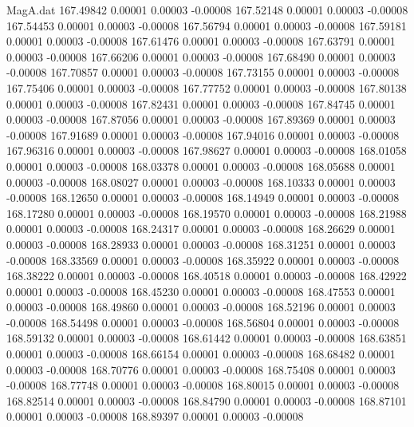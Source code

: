\begin{filecontents}{MagA.dat}
 167.49842    0.00001    0.00003   -0.00008
 167.52148    0.00001    0.00003   -0.00008
 167.54453    0.00001    0.00003   -0.00008
 167.56794    0.00001    0.00003   -0.00008
 167.59181    0.00001    0.00003   -0.00008
 167.61476    0.00001    0.00003   -0.00008
 167.63791    0.00001    0.00003   -0.00008
 167.66206    0.00001    0.00003   -0.00008
 167.68490    0.00001    0.00003   -0.00008
 167.70857    0.00001    0.00003   -0.00008
 167.73155    0.00001    0.00003   -0.00008
 167.75406    0.00001    0.00003   -0.00008
 167.77752    0.00001    0.00003   -0.00008
 167.80138    0.00001    0.00003   -0.00008
 167.82431    0.00001    0.00003   -0.00008
 167.84745    0.00001    0.00003   -0.00008
 167.87056    0.00001    0.00003   -0.00008
 167.89369    0.00001    0.00003   -0.00008
 167.91689    0.00001    0.00003   -0.00008
 167.94016    0.00001    0.00003   -0.00008
 167.96316    0.00001    0.00003   -0.00008
 167.98627    0.00001    0.00003   -0.00008
 168.01058    0.00001    0.00003   -0.00008
 168.03378    0.00001    0.00003   -0.00008
 168.05688    0.00001    0.00003   -0.00008
 168.08027    0.00001    0.00003   -0.00008
 168.10333    0.00001    0.00003   -0.00008
 168.12650    0.00001    0.00003   -0.00008
 168.14949    0.00001    0.00003   -0.00008
 168.17280    0.00001    0.00003   -0.00008
 168.19570    0.00001    0.00003   -0.00008
 168.21988    0.00001    0.00003   -0.00008
 168.24317    0.00001    0.00003   -0.00008
 168.26629    0.00001    0.00003   -0.00008
 168.28933    0.00001    0.00003   -0.00008
 168.31251    0.00001    0.00003   -0.00008
 168.33569    0.00001    0.00003   -0.00008
 168.35922    0.00001    0.00003   -0.00008
 168.38222    0.00001    0.00003   -0.00008
 168.40518    0.00001    0.00003   -0.00008
 168.42922    0.00001    0.00003   -0.00008
 168.45230    0.00001    0.00003   -0.00008
 168.47553    0.00001    0.00003   -0.00008
 168.49860    0.00001    0.00003   -0.00008
 168.52196    0.00001    0.00003   -0.00008
 168.54498    0.00001    0.00003   -0.00008
 168.56804    0.00001    0.00003   -0.00008
 168.59132    0.00001    0.00003   -0.00008
 168.61442    0.00001    0.00003   -0.00008
 168.63851    0.00001    0.00003   -0.00008
 168.66154    0.00001    0.00003   -0.00008
 168.68482    0.00001    0.00003   -0.00008
 168.70776    0.00001    0.00003   -0.00008
 168.75408    0.00001    0.00003   -0.00008
 168.77748    0.00001    0.00003   -0.00008
 168.80015    0.00001    0.00003   -0.00008
 168.82514    0.00001    0.00003   -0.00008
 168.84790    0.00001    0.00003   -0.00008
 168.87101    0.00001    0.00003   -0.00008
 168.89397    0.00001    0.00003   -0.00008

\end{filecontents}
